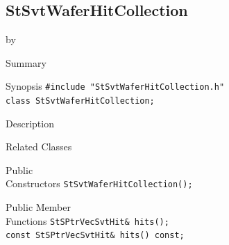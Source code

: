 \documentclass[twoside]{article}
\newcommand{\entrylabel}[1]{\mbox{\textbf{{#1}}}\hfil}%
\newenvironment{entry}
{\begin{list}{}%
    {\renewcommand{\makelabel}{\entrylabel}%
     \setlength{\labelwidth}{90pt}%
     \setlength{\leftmargin}{\labelwidth}
     \advance\leftmargin by \labelsep%
      }%
    }%
  {\end{list}}
\newcommand{\Entrylabel}[1]%
{\raisebox{0pt}[1ex][0pt]{\makebox[\labelwidth][l]%
    {\parbox[t]{\labelwidth}{\hspace{0pt}\textbf{{#1}}}}}}
\newenvironment{Entry}%
{\renewcommand{\entrylabel}{\Entrylabel}\begin{entry}}%
  {\end{entry}}
\begin{document}
\subsection{StSvtWaferHitCollection}
\label{sec:StSvtWaferHitCollection}
\begin{Entry}
\item[Summary]
\item[Synopsis]
    \verb+#include "StSvtWaferHitCollection.h"+\\
    \verb+class StSvtWaferHitCollection;+\\
\item[Description]
\item[Related Classes]
\item[Public\\ Constructors]
    \verb+StSvtWaferHitCollection();+\\
\item[Public Member\\ Functions]
    \verb+StSPtrVecSvtHit& hits();+\\
    \verb+const StSPtrVecSvtHit& hits() const;+\\
\end{Entry}
\clearpage
\end{document}
